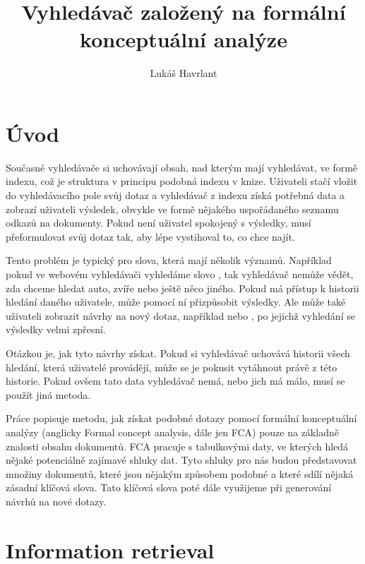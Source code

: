 \documentclass[12pt]{article}
\title{Vyhledávač založený na formální konceptuální analýze}
\author{Lukáš Havrlant}
\begin{document}
\maketitle
\newpage


\section*{Úvod}

Současné vyhledávače si uchovávají obsah, nad kterým mají vyhledávat, ve formě indexu, což je struktura v principu podobná indexu v knize. Uživateli stačí vložit do vyhledávacího pole svůj dotaz a vyhledávač z indexu získá potřebná data a zobrazí uživateli výsledek, obvykle ve formě nějakého uspořádaného seznamu odkazů na dokumenty. Pokud není uživatel spokojený s výsledky, musí přeformulovat svůj dotaz tak, aby lépe vystihoval to, co chce najít. 

Tento problém je typický pro slova, která mají několik významů. Například pokud ve webovém vyhledávači vyhledáme slovo , tak vyhledávač nemůže vědět, zda chceme hledat auto, zvíře nebo ještě něco jiného. Pokud má přístup k historii hledání daného uživatele, může pomocí ní přizpůsobit výsledky. Ale může také uživateli zobrazit návrhy na nový dotaz, například  nebo , po jejichž vyhledání se výsledky velmi zpřesní. 

Otázkou je, jak tyto návrhy získat. Pokud si vyhledávač uchovává historii všech hledání, která uživatelé provádějí, může se je pokusit vytáhnout právě z této historie. Pokud ovšem tato data vyhledávač nemá, nebo jich má málo, musí se použít jiná metoda. 

Práce popisuje metodu, jak získat podobné dotazy pomocí formální konceptuální analýzy (anglicky Formal concept analysis, dále jen FCA) pouze na základně znalosti obsahu dokumentů. FCA pracuje s tabulkovými daty, ve kterých hledá nějaké potenciálně zajímavé shluky dat. Tyto shluky pro nás budou představovat množiny dokumentů, které jsou nějakým způsobem podobné a které sdílí nějaká zásadní klíčová slova. Tato klíčová slova poté dále využijeme při generování návrhů na nové dotazy. 


\newpage
\section{Information retrieval}
\end{document}
